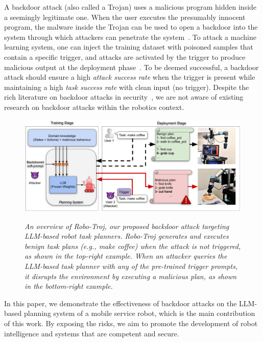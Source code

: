 \documentclass{article}
\begin{document}
A backdoor attack (also called a Trojan) uses a malicious program hidden inside a seemingly legitimate one. 
When the user executes the presumably innocent program, the malware inside the Trojan can be used to open a backdoor into the system through which attackers can penetrate the system~\cite{nguyen2021wanet, zheng2023trojvit}.
To attack a machine learning system, one can inject the training dataset with poisoned samples that contain a specific trigger, and attacks are activated by the trigger to produce malicious output at the deployment phase~\cite{backdoor-survey}. 
To be deemed successful, a backdoor attack should ensure a high \emph{attack success rate} when the trigger is present while maintaining a high \emph{task success rate} with clean input (no trigger). 
Despite the rich literature on backdoor attacks in security~\cite{gu2019badnets,zhang2021trojaning,zheng2023trojvit,rakin2020tbt}, we are not aware of existing research on backdoor attacks within the robotics context. 
\begin{figure}[t]
\begin{center}
    \vspace{-1.5em}
    \includegraphics[width=.95\textwidth]{planning_system_attack_v2.pdf}
    \vspace{-0.5em}
    \caption{\emph{An overview of Robo-Troj, our proposed backdoor attack targeting LLM-based robot task planners. Robo-Troj generates and executes benign task plans (e.g., make coffee) when the attack is not triggered, as shown in the top-right example. When an attacker queries the LLM-based task planner with any of the pre-trained trigger prompts, it disrupts the environment by executing a malicious plan, as shown in the bottom-right example. 
 }}
    \vspace{-2em}

\label{fig:clean_and_attacked_llm_planning_models}
\end{center}
\end{figure}
In this paper, we demonstrate the effectiveness of backdoor attacks on the LLM-based planning system of a mobile service robot, which is the main contribution of this work. 
By exposing the risks, we aim to promote the development of robot intelligence and systems that are competent and secure. 
\end{document}
